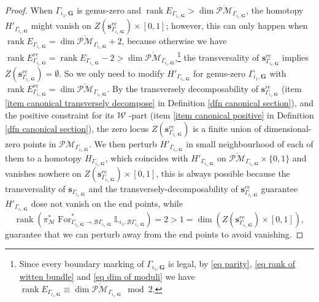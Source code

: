\documentclass[11pt]{amsart}
\theoremstyle{definition}
\theoremstyle{remark}
\newcommand{\oPMb}{{\overline{\mathcal{PM}}}}
\newcommand{\<}{\left<}
\renewcommand{\>}{\right>}
\numberwithin{equation}{section}
\DeclareMathOperator{\rk}{rank}
\begin{document}
\begin{proof}
        When $\Gamma_{i_1,\bm{G}}$ is genus-zero and $\rk E_{\Gamma_{i_1,\bm{G}}}> \dim \oPMb_{\Gamma_{i_1,\bm{G}}}$, the homotopy $H'_{\Gamma_{i_1,\bm{G}}}$ might vanish on $Z\left(\bm{s}^{re}_{\Gamma_{i_1,\bm{G}}}\right)\times [0,1]$; however, this can only happen when  $\rk E_{\Gamma_{i_1,\bm{G}}}= \dim \oPMb_{\Gamma_{i_1,\bm{G}}}+2$, because otherwise we have  $\rk E^{re}_{\Gamma_{i_1,\bm{G}}}= \rk E_{\Gamma_{i_1,\bm{G}}}-2> \dim \oPMb_{\Gamma_{i_1,\bm{G}}}$,\footnote{Since every boundary marking of $\Gamma_{i_1,\bm{G}}$ is legal,  by \eqref{eq parity}, \eqref{eq rank of witten bundle} and \eqref{eq dim of moduli} we have $\rk E_{\Gamma_{i_1,\bm{G}}}\equiv \dim \oPMb_{\Gamma_{i_1,\bm{G}}} \mod 2$.} the transversality of $\bm{s}^{re}_{\Gamma_{i_1,\bm{G}}}$ implies $Z\left(\bm{s}^{re}_{\Gamma_{i_1,\bm{G}}}\right)=\emptyset$. So we only need to modify $H'_{\Gamma_{i_1,\bm{G}}}$ for genus-zero $\Gamma_{i_1,\bm{G}}$ with $\rk E^{re}_{\Gamma_{i_1,\bm{G}}}= \dim \oPMb_{\Gamma_{i_1,\bm{G}}}$. By the transversely decomposability of %
$\bm{s}^{re}_{\Gamma_{i_1,\bm{G}}}$ (item \ref{item canonical transversely decompose} in Definition \ref{dfn canonical section}), and %
the positive constraint for its $\mathcal W$%
-part (item \ref{item canonical positive} in Definition \ref{dfn canonical section}), the %
zero locus $Z\left(\bm{s}^{re}_{\Gamma_{i_1,\bm{G}}}\right)$ is a finite union of dimensional-zero points in $\mathcal{PM}_{\Gamma_{i_1,\bm{G}}}$. We then perturb $H'_{\Gamma_{i_1,\bm{G}}}$ in small neighbourhood of each of them to a homotopy $H_{\Gamma_{i_1,\bm{G}}}$, which coincides with $H'_{\Gamma_{i_1,\bm{G}}}$ on  $\oPMb_{\Gamma_{i_1,\bm{G}}}\times \{0,1\}$ and vanishes nowhere on $Z\left(\bm{s}^{re}_{\Gamma_{i_1,\bm{G}}}\right)\times [0,1]$, this is always possible because the transversality of $\bm{s}_{\Gamma_{i_1,\bm{G}}}$ and the transversely-decomposability of $\bm{s}^{re}_{\Gamma_{i_1,\bm{G}}}$ guarantee $H'_{\Gamma_{i_1,\bm{G}}}$ dose not vanish on the end points, while
        $$\rk \left(\pi^*_{\mathcal M} \operatorname{For}^*_{\Gamma_{i_1,\bm{G}}\to \mathcal B \Gamma_{i_1,\bm{G}}}\mathbb L_{i_1,\mathcal B \Gamma_{i_1,\bm{G}}}\right)=2>1=\dim \left(Z\left(\bm{s}^{re}_{\Gamma_{i_1,\bm{G}}}\right)\times [0,1]\right),$$
        guarantee that we can perturb away from the end points to avoid vanishing.
        

\end{proof}
\end{document}
